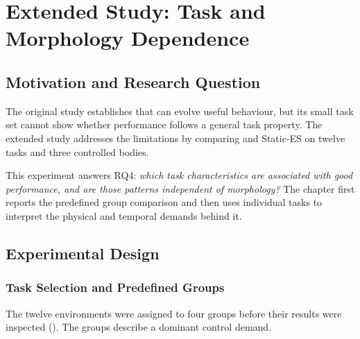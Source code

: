 \chapter[Extended Study: Task and Morphology Dependence]{Extended Study: Task and\\Morphology Dependence}
\label{cha:extended}

\section{Motivation and Research Question}
\label{sec:extended-motivation}

The original study establishes that \nchl{} can evolve useful behaviour, but its small task set cannot show whether performance follows a general task property. The extended study addresses the limitations by comparing \nchlcontroller{} and Static-ES on twelve tasks and three controlled bodies.

This experiment answers RQ4: \emph{which task characteristics are associated with good \nchl{} performance, and are those patterns independent of morphology?} The chapter first reports the predefined group comparison and then uses individual tasks to interpret the physical and temporal demands behind it.

\section{Experimental Design}
\label{sec:extended-design}

\subsection{Task Selection and Predefined Groups}

The twelve environments were assigned to four groups before their results were inspected (). The groups describe a dominant control demand.

